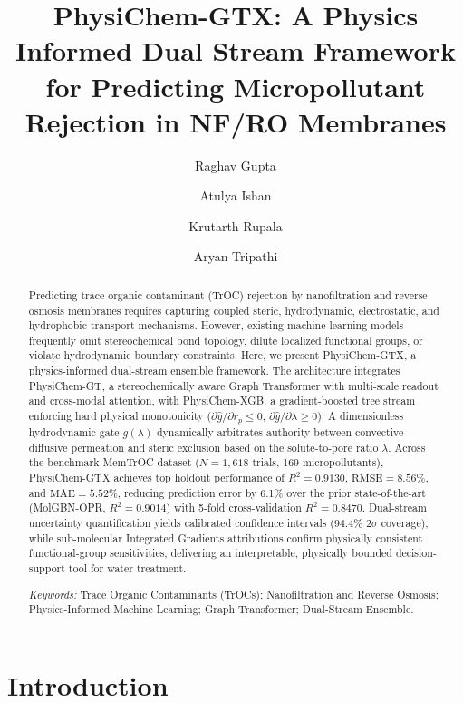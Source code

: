 \documentclass[11pt]{article}
\title{\vspace{-1.0cm}\Large PhysiChem-GTX: A Physics Informed Dual Stream Framework for Predicting Micropollutant Rejection in NF/RO Membranes}
\author{Raghav Gupta}
\author{Atulya Ishan}
\author{Krutarth Rupala}
\author{Aryan Tripathi}
\affil{Department of Data Science and Engineering, Manipal Institute of Technology, Manipal Academy of Higher Education, Manipal, Karnataka 576104, India}
\date{}
\newcommand{\rsq}{R^{2}}
\begin{document}
\maketitle

\begin{abstract}
\noindent
Predicting trace organic contaminant (TrOC) rejection by nanofiltration and reverse osmosis membranes requires capturing coupled steric, hydrodynamic, electrostatic, and hydrophobic transport mechanisms. However, existing machine learning models frequently omit stereochemical bond topology, dilute localized functional groups, or violate hydrodynamic boundary constraints. Here, we present PhysiChem-GTX, a physics-informed dual-stream ensemble framework. The architecture integrates PhysiChem-GT, a stereochemically aware Graph Transformer with multi-scale readout and cross-modal attention, with PhysiChem-XGB, a gradient-boosted tree stream enforcing hard physical monotonicity ($\partial \hat{y}/\partial r_p \leq 0$, $\partial \hat{y}/\partial \lambda \geq 0$). A dimensionless hydrodynamic gate $g(\lambda)$ dynamically arbitrates authority between convective-diffusive permeation and steric exclusion based on the solute-to-pore ratio $\lambda$. Across the benchmark MemTrOC dataset ($N = 1{,}618$ trials, 169 micropollutants), PhysiChem-GTX achieves top holdout performance of $\rsq = 0.9130$, $\mathrm{RMSE} = 8.56\%$, and $\mathrm{MAE} = 5.52\%$, reducing prediction error by 6.1\% over the prior state-of-the-art (MolGBN-OPR, $\rsq = 0.9014$) with 5-fold cross-validation $\rsq = 0.8470$. Dual-stream uncertainty quantification yields calibrated confidence intervals ($94.4\%$ $2\sigma$ coverage), while sub-molecular Integrated Gradients attributions confirm physically consistent functional-group sensitivities, delivering an interpretable, physically bounded decision-support tool for water treatment.

\smallskip
\noindent\textit{Keywords:} Trace Organic Contaminants (TrOCs); Nanofiltration and Reverse Osmosis; Physics-Informed Machine Learning; Graph Transformer; Dual-Stream Ensemble.
\end{abstract}

\vspace{0.4cm}


\section{Introduction}
\label{sec:intro}
\end{document}
